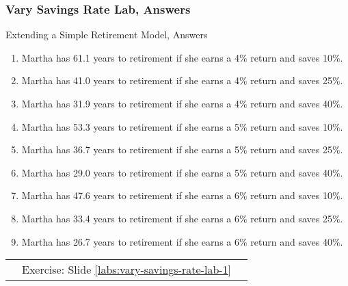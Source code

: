 \documentclass[handout, 11pt]{beamer}
\begin{document}
\appendix
{}
\setcounter{finalframe}{\value{framenumber}}
\small
\begin{frame}
\frametitle{Vary Savings Rate Lab, Answers}
{
\begin{block}{Extending a Simple Retirement Model, Answers}
\begin{enumerate}
\item Martha has 61.1 years to retirement if she earns a 4\% return and saves 10\%.
\item Martha has 41.0 years to retirement if she earns a 4\% return and saves 25\%.
\item Martha has 31.9 years to retirement if she earns a 4\% return and saves 40\%.
\item Martha has 53.3 years to retirement if she earns a 5\% return and saves 10\%.
\item Martha has 36.7 years to retirement if she earns a 5\% return and saves 25\%.
\item Martha has 29.0 years to retirement if she earns a 5\% return and saves 40\%.
\item Martha has 47.6 years to retirement if she earns a 6\% return and saves 10\%.
\item Martha has 33.4 years to retirement if she earns a 6\% return and saves 25\%.
\item Martha has 26.7 years to retirement if she earns a 6\% return and saves 40\%.
\end{enumerate}
\vfill
\begin{tabular*}{\textwidth}{@{\extracolsep{\fill}}ccc}
\toprule
\hfill & Exercise: Slide \textcolor{blue}{\underline{\ref{labs:vary-savings-rate-lab-1}}} & \hfill\\

\end{tabular*}
\end{block}
}
\label{labs:vary-savings-rate-lab-1-answers}
\end{frame}
\normalsize
\setcounter{framenumber}{\value{finalframe}}
\end{document}
